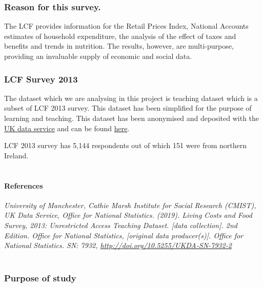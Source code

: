 \documentclass[]{article}
\let\oldparagraph\paragraph
\renewcommand{\paragraph}[1]{\oldparagraph{#1}\mbox{}}
\begin{document}
\hypertarget{reason-for-this-survey.}{%
\subsubsection{Reason for this survey.}\label{reason-for-this-survey.}}

The LCF provides information for the Retail Prices Index, National
Accounts estimates of household expenditure, the analysis of the effect
of taxes and benefits and trends in nutrition. The results, however, are
multi-purpose, providing an invaluable supply of economic and social
data.

\hypertarget{lcf-survey-2013}{%
\subsubsection{LCF Survey 2013}\label{lcf-survey-2013}}

The dataset which we are analysing in this project is teaching dataset
which is a subset of LCF 2013 survey. This dataset has been simplified
for the purpose of learning and teaching. This dataset has been
anonymised and deposited with the \href{https://ukdataservice.ac.uk}{UK
data service} and can be found
\href{https://beta.ukdataservice.ac.uk/datacatalogue/studies/study?id=7932\#!/details}{here}.

LCF 2013 survey has 5,144 respondents out of which 151 were from
northern Ireland.\\
~\\

\hypertarget{references}{%
\paragraph{References}\label{references}}

\emph{University of Manchester, Cathie Marsh Institute for Social
Research (CMIST), UK Data Service, Office for National Statistics.
(2019). Living Costs and Food Survey, 2013: Unrestricted Access Teaching
Dataset. {[}data collection{]}. 2nd Edition. Office for National
Statistics, {[}original data producer(s){]}. Office for National
Statistics. SN: 7932, \url{http://doi.org/10.5255/UKDA-SN-7932-2}}\\
~\\

\hypertarget{purpose-of-study}{%
\subsubsection{Purpose of study}\label{purpose-of-study}}
\end{document}
